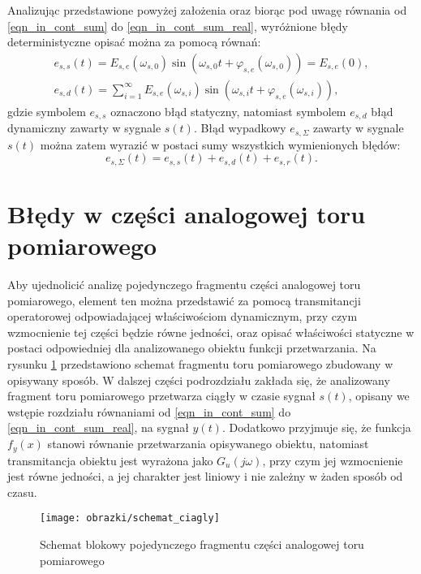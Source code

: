Analizując przedstawione powyżej założenia oraz biorąc pod uwagę równania od \eqref{eqn_in_cont_sum} do \eqref{eqn_in_cont_sum_real}, wyróżnione błędy deterministyczne opisać można za pomocą równań:
\begin{gather}
e_{s,s} \left( t \right) = E_{s,e} \left( \omega_{s,0} \right) \sin \left( \omega_{s,0} t + \varphi_{s,e} \left( \omega_{s,0} \right) \right) = E_{s,e} \left( 0 \right) \label{eqn_in_cont_err_stat}, \\
e_{s,d} \left( t \right) = \sum _{i = 1} ^{\infty} E_{s,e} \left( \omega_{s,i} \right) \sin \left( \omega_{s,i} t + \varphi_{s,e} \left( \omega_{s,i} \right) \right) \label{eqn_in_cont_err_dyn},
\end{gather}
gdzie symbolem $e_{s,s}$ oznaczono błąd statyczny, natomiast symbolem $e_{s,d}$ błąd dynamiczny zawarty w sygnale $s(t)$. Błąd wypadkowy $e_{s,\Sigma}$ zawarty w sygnale $s(t)$ można zatem wyrazić w postaci sumy wszystkich wymienionych błędów:
\begin{equation}
e_{s,\Sigma} \left( t \right) = e_{s,s} \left( t \right) + e_{s,d} \left( t \right) + e_{s,r} \left( t \right) \label{eqn_in_cont_err_sum}.
\end{equation}

\section{Błędy w części analogowej toru pomiarowego}

Aby ujednolicić analizę pojedynczego fragmentu części analogowej toru pomiarowego, element ten można przedstawić za pomocą transmitancji operatorowej odpowiadającej właściwościom dynamicznym, przy czym wzmocnienie tej części będzie równe jedności, oraz opisać właściwości statyczne w postaci odpowiedniej dla analizowanego obiektu funkcji przetwarzania. Na rysunku \ref{fig_chain_cont} przedstawiono schemat fragmentu toru pomiarowego zbudowany w opisywany sposób. W dalszej części podrozdziału zakłada się, że analizowany fragment toru pomiarowego przetwarza ciągły w czasie sygnał $s(t)$, opisany we wstępie rozdziału równaniami od \eqref{eqn_in_cont_sum} do \eqref{eqn_in_cont_sum_real}, na sygnał $y(t)$. Dodatkowo przyjmuje się, że funkcja $f_{y}(x)$ stanowi równanie przetwarzania opisywanego obiektu, natomiast transmitancja obiektu jest wyrażona jako $G_{u}(j\omega)$, przy czym jej wzmocnienie jest równe jedności, a jej charakter jest liniowy i nie zależny w żaden sposób od czasu.

\begin{figure}[htb!]
\begin{center}
\texttt{[image: obrazki/schemat\_ciagly]}
\caption{Schemat blokowy pojedynczego fragmentu części analogowej toru pomiarowego \label{fig_chain_cont}}
\end{center}
\end{figure}


